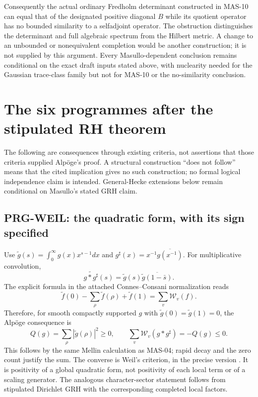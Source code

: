 \documentclass[11pt,a4paper]{article}
\newcommand{\fid}[1]{\textsf{#1}}
\begin{document}
Consequently the actual ordinary Fredholm determinant constructed in \fid{MAS-10} can equal that of the designated positive diagonal $B$ while its quotient operator has no bounded similarity to a selfadjoint operator. The obstruction distinguishes the determinant and full algebraic spectrum from the Hilbert metric. A change to an unbounded or nonequivalent completion would be another construction; it is not supplied by this argument. Every Masullo-dependent conclusion remains conditional on the exact draft inputs stated above, with nuclearity needed for the Gaussian trace-class family but not for \fid{MAS-10} or the no-similarity conclusion.

\section{The six programmes after the stipulated RH theorem}
The following are consequences through existing criteria, not assertions that those criteria supplied Alp\"oge's proof. A structural construction ``does not follow'' means that the cited implication gives no such construction; no formal logical independence claim is intended. General-Hecke extensions below remain conditional on Masullo's stated GRH claim.

\subsection{PRG-WEIL: the quadratic form, with its sign specified}
Use $\widetilde g(s)=\int_0^\infty g(x)x^{s-1}dx$ and $g^\sharp(x)=x^{-1}\overline{g(x^{-1})}$. For multiplicative convolution,
\[
 \widetilde{g*g^\sharp}(s)=\widetilde g(s)\overline{\widetilde g(1-\bar s)}.
\]
The explicit formula in the attached Connes--Consani normalization reads
\[
 \widetilde f(0)-\sum_\rho\widetilde f(\rho)+\widetilde f(1)=\sum_v\mathcal W_v(f).
\]
Therefore, for smooth compactly supported $g$ with $\widetilde g(0)=\widetilde g(1)=0$, the Alp\"oge consequence is
\[
 Q(g)=\sum_\rho|\widetilde g(\rho)|^2\ge0,
 \qquad \sum_v\mathcal W_v(g*g^\sharp)=-Q(g)\le0.
\]
This follows by the same Mellin calculation as \fid{MAS-04}; rapid decay and the zero count justify the sum. The converse is Weil's criterion, in the precise version \cite[Appendix C, Proposition C.1, label \texttt{mainprop}]{cc}. It is positivity of a global quadratic form, not positivity of each local term or of a scaling generator. The analogous character-sector statement follows from stipulated Dirichlet GRH with the corresponding completed local factors.
\end{document}
